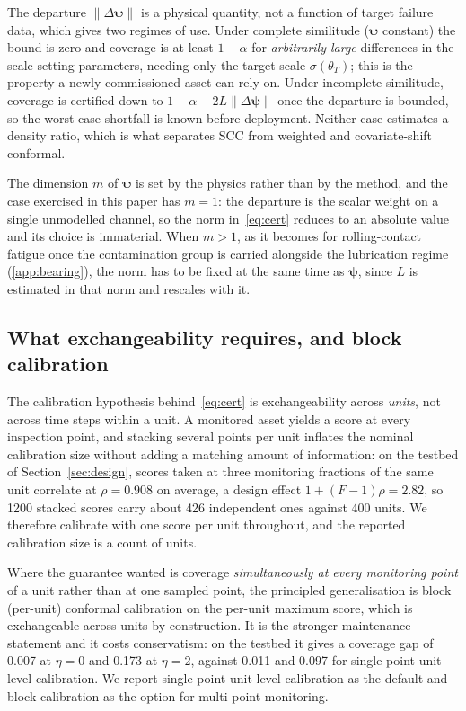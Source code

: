 The departure $\lVert\Delta\boldsymbol\psi\rVert$ is a physical quantity, not a function of target
failure data, which gives two regimes of use. Under complete similitude ($\boldsymbol\psi$ constant)
the bound is zero and coverage is at least $1-\alpha$ for \emph{arbitrarily large} differences in the
scale-setting parameters, needing only the target scale $\sigma(\theta_T)$; this is the property a
newly commissioned asset can rely on. Under incomplete similitude, coverage is certified down to
$1-\alpha-2L\lVert\Delta\boldsymbol\psi\rVert$ once the departure is bounded, so the worst-case
shortfall is known before deployment. Neither case estimates a density ratio, which is what separates
SCC from weighted and covariate-shift conformal.

The dimension $m$ of $\boldsymbol\psi$ is set by the physics rather than by the method, and the case
exercised in this paper has $m=1$: the departure is the scalar weight on a single unmodelled
channel, so the norm in~\eqref{eq:cert} reduces to an absolute value and its choice is immaterial.
When $m>1$, as it becomes for rolling-contact fatigue once the contamination group is carried
alongside the lubrication regime (\ref{app:bearing}), the norm has to be fixed at the same time as
$\boldsymbol\psi$, since $L$ is estimated in that norm and rescales with it.

\subsection{What exchangeability requires, and block calibration}\label{sec:exch}
The calibration hypothesis behind~\eqref{eq:cert} is exchangeability across \emph{units}, not across
time steps within a unit. A monitored asset yields a score at every inspection point, and stacking
several points per unit inflates the nominal calibration size without adding a matching amount of
information: on the testbed of Section~\ref{sec:design}, scores taken at three monitoring fractions
of the same unit correlate at $\rho=0.908$ on average, a design effect $1+(F-1)\rho=2.82$, so 1200
stacked scores carry about 426 independent ones against 400 units. We therefore calibrate with one
score per unit throughout, and the reported calibration size is a count of units.

Where the guarantee wanted is coverage \emph{simultaneously at every monitoring point} of a unit
rather than at one sampled point, the principled generalisation is block (per-unit) conformal
calibration on the per-unit maximum score, which is exchangeable across units by construction. It
is the stronger maintenance statement and it costs conservatism: on the testbed it gives a coverage
gap of 0.007 at $\eta=0$ and 0.173 at $\eta=2$, against 0.011 and 0.097 for single-point unit-level
calibration. We report single-point unit-level calibration as the default and block calibration as
the option for multi-point monitoring.


